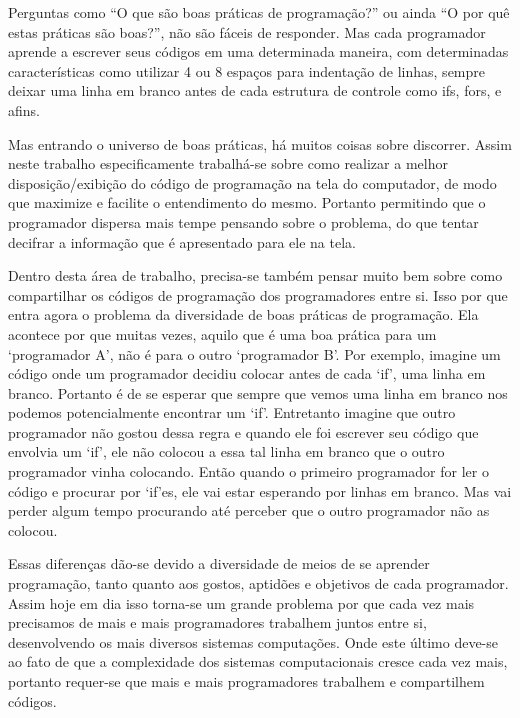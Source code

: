{
    Perguntas como ``O que são boas práticas de programação?'' ou ainda ``O por quê estas práticas
    são boas?'', não são fáceis de responder. Mas cada programador aprende a escrever seus códigos
    em uma determinada maneira, com determinadas características como utilizar 4 ou 8 espaços para
    indentação de linhas, sempre deixar uma linha em branco antes de cada estrutura de controle como
    if\textquotesingle s, for\textquotesingle s, e afins.

    Mas entrando o universo de boas práticas, há muitos coisas sobre discorrer. Assim neste trabalho
    especificamente trabalhá-se sobre como realizar a melhor disposição/exibição do código de
    programação na tela do computador, de modo que maximize e facilite o entendimento do mesmo.
    Portanto permitindo que o programador dispersa mais tempe pensando sobre o problema, do que
    tentar decifrar a informação que é apresentado para ele na tela.

    Dentro desta área de trabalho, precisa-se também pensar muito bem sobre como compartilhar os
    códigos de programação dos programadores entre si. Isso por que entra agora o problema da
    diversidade de boas práticas de programação. Ela acontece por que muitas vezes, aquilo que é uma
    boa prática para um `programador A', não é para o outro `programador B'. Por exemplo, imagine um
    código onde um programador decidiu colocar antes de cada `if', uma linha em branco. Portanto é
    de se esperar que sempre que vemos uma linha em branco nos podemos potencialmente encontrar um
    `if'. Entretanto imagine que outro programador não gostou dessa regra e quando ele foi escrever
    seu código que envolvia um `if', ele não colocou a essa tal linha em branco que o outro
    programador vinha colocando. Então quando o primeiro programador for ler o código e procurar por
    `if'es, ele vai estar esperando por linhas em branco. Mas vai perder algum tempo procurando até
    perceber que o outro programador não as colocou.

    Essas diferenças dão-se devido a diversidade de meios de se aprender programação, tanto quanto
    aos gostos, aptidões e objetivos de cada programador. Assim hoje em dia isso torna-se um grande
    problema por que cada vez mais precisamos de mais e mais programadores trabalhem juntos entre
    si, desenvolvendo os mais diversos sistemas computações. Onde este último deve-se ao fato de que
    a complexidade dos sistemas computacionais cresce cada vez mais, portanto requer-se que mais e
    mais programadores trabalhem e compartilhem códigos.

}
